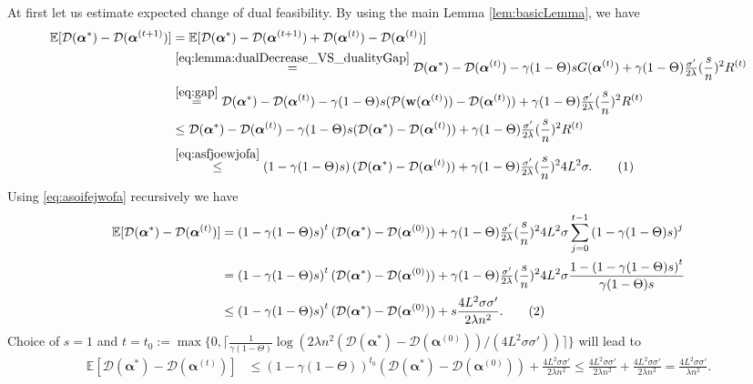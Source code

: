 \documentclass{article}
\newcommand{\Exp}{\mathbb{E}}                      %
\newcommand\tagthis{\addtocounter{equation}{1}\tag{\theequation}}
\newcommand{\wv}{ {\bf w}}
\newcommand{\alphav}{ {\boldsymbol \alpha}}
\newcommand{\0}{ {\bf 0}}
\newcommand{\vc}[2]{#1^{(#2)}}                   %
\newcommand{\bP}{\mathcal{P}}
\newcommand{\bD}{\mathcal{D}}
\theoremstyle{plain}
\theoremstyle{definition}
\begin{document}
 
At first let us estimate expected change of dual feasibility. By using the main Lemma \ref{lem:basicLemma}, we have
\begin{align*} 
 \Exp[\bD(\alphav^*)-\bD(\vc{\alphav}{t+1})]
 &=
\Exp[\bD(\alphav^*)-\bD(\vc{\alphav}{t+1})+\bD(\vc{\alphav}{t})-\bD(\vc{\alphav}{t})]
\\
&
\overset{\eqref{eq:lemma:dualDecrease_VS_dualityGap}
}{=}
\bD(\alphav^*)-\bD(\vc{\alphav}{t})
-\gamma
(1-\Theta)  
 s G(\vc{\alphav}{t})
+
\gamma
(1-\Theta)
\tfrac{\sigma'}{2\lambda }
(\frac s{  n})^2
\vc{R}{t}
\\
&
\overset{\eqref{eq:gap}
}{=}
\bD(\alphav^*)-\bD(\vc{\alphav}{t})
-\gamma
(1-\Theta)
   s  (\bP(\wv(\vc{\alphav}{t}))-\bD(\vc{\alphav}{t}))
+
\gamma
(1-\Theta)  \tfrac{\sigma'}{2\lambda }
(\frac s{  n})^2
\vc{R}{t} 
\\
&\leq
\bD(\alphav^*)-\bD(\vc{\alphav}{t})
-\gamma
(1-\Theta)
 s  (\bD(\alphav^* )-\bD(\vc{\alphav}{t}) )
+
\gamma
(1-\Theta) 
\tfrac{\sigma'}{2\lambda }
(\frac s{  n})^2
\vc{R}{t} \\
&
\overset{\eqref{eq:asfjoewjofa}}{\leq} 
\left( 
 1-\gamma
(1-\Theta)
   s
\right) 
   (\bD(\alphav^* )-\bD(\vc{\alphav}{t}))
+
\gamma
(1-\Theta) 
\tfrac{\sigma'}{2\lambda }
(\frac s{  n})^2
4L^2  \sigma.
\tagthis 
\label{eq:asoifejwofa}
\end{align*}
 Using
\eqref{eq:asoifejwofa}
recursively we have 
 \begin{align*} 
 \Exp[\bD(\alphav^*)-\bD(\vc{\alphav}{t})]
 &=
\left( 
 1-\gamma
(1-\Theta)
   s
\right)^t 
   (\bD(\alphav^* )-\bD(\vc{\alphav}{0}))
+
\gamma
(1-\Theta) 
\tfrac{\sigma'}{2\lambda }
(\frac s{  n})^2
4L^2  \sigma 
\sum_{j=0}^{t-1}
\left( 
 1-\gamma
(1-\Theta)
   s
\right)^j
\\
&=
\left( 
 1-\gamma
(1-\Theta)
   s
\right)^t 
   (\bD(\alphav^* )-\bD(\vc{\alphav}{0}))
+
\gamma
(1-\Theta) 
\tfrac{\sigma'}{2\lambda }
(\frac s{  n})^2
4L^2  \sigma 
\frac{1-\left( 
 1-\gamma
(1-\Theta)
   s
\right)^t}
     { 
  \gamma
(1-\Theta)
   s }
\\
&\leq
\left( 
 1-\gamma
(1-\Theta)
   s
\right)^t 
   (\bD(\alphav^* )-\bD(\vc{\alphav}{0}))
+
 s
\frac{4L^2  \sigma   \sigma'}{2\lambda n^2}. 
\tagthis
\label{eq:asfwefcaw}  
 \end{align*}
Choice of 
$s=1$ and $t= t_0:= \max\{0,\lceil  
\frac1{\gamma (1-\Theta)}
\log(
 2\lambda n^2 (\bD(\alphav^* )-\bD(\vc{\alphav}{0}))
  / (4 L^2 \sigma \sigma')
  )
 \rceil\}$
will lead to 
\begin{align}\label{eq:induction_step1}
  \Exp[\bD(\alphav^*)-\bD(\vc{\alphav}{t})]
 &\leq  
\left( 
 1-\gamma
(1-\Theta)  
\right)^{t_0}
  (\bD(\alphav^* )-\bD(\vc{\alphav}{0}))
+ 
\frac{4L^2  \sigma   \sigma'}{2\lambda n^2}
\leq 
\frac{4L^2  \sigma   \sigma'}{2\lambda n^2}
+
\frac{4L^2  \sigma   \sigma'}{2\lambda n^2}
=
\frac{4L^2  \sigma   \sigma'}{\lambda n^2}.
\end{align} 
\end{document}
